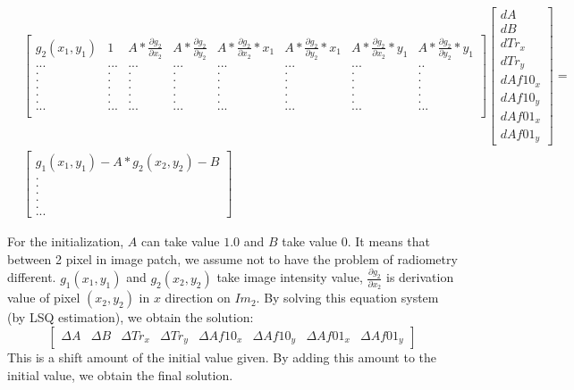 \documentclass[twoside]{article}
\begin{document}
\begin{equation}
\begin{aligned}
 	&\begin{bmatrix}
        g_2(x_1,y_1) & 1 & A*\frac{\partial g_2}{\partial x_2} & A*\frac{\partial g_2}{\partial y_2} & A*\frac{\partial g_2}{\partial x_2}*x_1 & A*\frac{\partial g_2}{\partial y_2}*x_1 & A*\frac{\partial g_2}{\partial x_2}*y_1 & A*\frac{\partial g_2}{\partial y_2}*y_1	\\
        ... & ... & ... & ... & ... & ... & ...&  .. \\
         .  &  .  &  .  &  .  &  .  &  .  &  . &  .  \\
         .  &  .  &  .  &  .  &  .  &  .  &  . &  .  \\
         .  &  .  &  .  &  .  &  .  &  .  &  . &  .  \\
         .  &  .  &  .  &  .  &  .  &  .  &  . &  .  \\
         .  &  .  &  .  &  .  &  .  &  .  &  . &  .  \\
        ... & ... & ... & ... & ... & ... & ...& ... \\
    \end{bmatrix}
    \begin{bmatrix}
		dA \\ dB \\ dTr_x \\ dTr_y \\ dAf10_x \\ dAf10_y \\ dAf01_x \\ dAf01_y
    \end{bmatrix}
     = 	\\
     &\begin{bmatrix}
     g_1(x_1,y_1) - A*g_2(x_2,y_2) - B  \\
     .			\\
     .			\\
     .			\\
     .			\\
     .			\\
     ...
     \end{bmatrix}
\end{aligned}
\end{equation}

For the initialization, $A$ can take value $1.0$ and $B$ take value $0$. It means that between 2 pixel in image patch, we assume not to have the problem of radiometry different. $g_1(x_1,y_1)$ and $g_2(x_2,y_2)$ take image intensity value, $\frac{\partial g_2}{\partial x_2}$ is derivation value of pixel $(x_2,y_2)$ in $x$ direction on $Im_2$. By solving this equation system (by LSQ estimation), we obtain the solution:
\begin{equation}
\begin{bmatrix}
		\Delta A & \Delta B & \Delta Tr_x & \Delta Tr_y & \Delta Af10_x & \Delta Af10_y & \Delta Af01_x & \Delta Af01_y
\end{bmatrix}
\end{equation}
This is a shift amount of the initial value given. By adding this amount to the initial value, we obtain the final solution.
\end{document}
